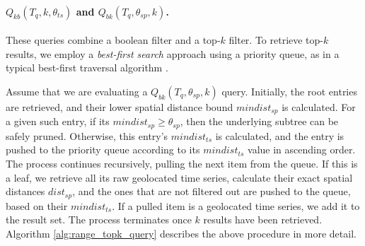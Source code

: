 \begin{algorithm}[!t]
	\DontPrintSemicolon
	\begin{footnotesize}
	\BlankLine
	\end{footnotesize}
	\caption{$Q_{bb}(T_q, \theta_{sp}, \theta_{ts})$}
	\label{alg:double_range_query}		
\end{algorithm}


\paragraph{$Q_{kb}(T_q, k, \theta_{ts})$ and $Q_{bk}(T_q, \theta_{sp}, k)$.} These queries combine a boolean filter and a top-$k$ filter. To retrieve top-$k$ results, we employ a \textit{best-first search} approach using a priority queue, as in a typical best-first traversal algorithm \cite{hjaltason99tods}.

Assume that we are evaluating a $Q_{bk}(T_q, \theta_{sp}, k)$ query. Initially, the root entries are retrieved, and their lower spatial distance bound $mindist_{sp}$ is calculated. For a given such entry, if its  $mindist_{sp}\geq\theta_{sp}$, then the underlying subtree can be safely pruned. Otherwise, this entry's $mindist_{ts}$ is calculated, and the entry is pushed to the priority queue according to its $mindist_{ts}$ value in ascending order. The process continues recursively, pulling the next item from the queue. If this is a leaf, we retrieve all its raw geolocated time series, calculate their exact spatial distances $dist_{sp}$, and the ones that are not filtered out are pushed to the queue, based on their $mindist_{ts}$. If a pulled item is a geolocated time series, we add it to the result set. The process terminates once $k$ results have been retrieved. Algorithm \ref{alg:range_topk_query} describes the above procedure in more detail. 

